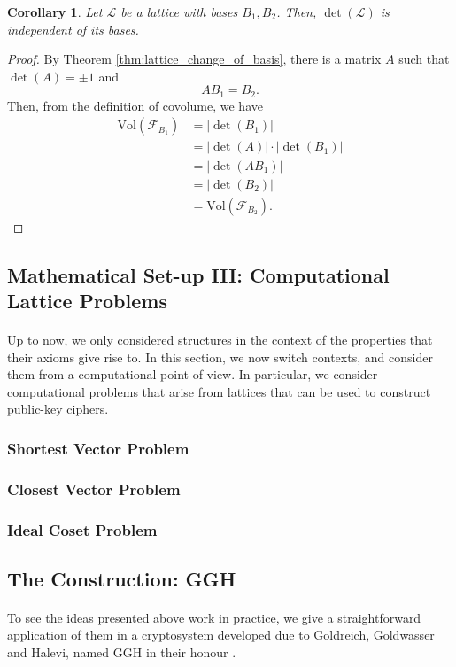 \documentclass{article}
\newtheorem{corollary}{Corollary}[theorem]
\theoremstyle{definition}
\newcommand{\Vol}{\text{Vol}}
\renewcommand{\L}{\mathcal{L}}
\newcommand{\F}{\mathcal{F}}
\begin{document}
\begin{corollary}
  Let $\L$ be a lattice with bases $B_1, B_2$. Then, $\det(\L)$ is independent
  of its bases.
\end{corollary}
\begin{proof}
  By Theorem \ref{thm:lattice_change_of_basis}, there is a matrix $A$ such that
  $\det(A) = \pm 1$ and
  \[
    AB_1 = B_2.
  \]
  Then, from the definition of covolume, we have
  \begin{align*}
    \Vol(\F_{B_1}) &= |\det(B_1)| \\
                  &= |\det(A)| \cdot |\det(B_1)| \\
                  &= |\det(AB_1) | \\
                  &= |\det(B_2)| \\
                  &= \Vol(\F_{B_2}).
  \end{align*}
\end{proof}
\subsection{Mathematical Set-up III: Computational Lattice Problems}
\paragraph{} Up to now, we only considered structures in the context of the
properties that their axioms give rise to. In this section, we now switch
contexts, and consider them from a computational point of view. In particular,
we consider computational problems that arise from lattices that can be used to
construct public-key ciphers.
\subsubsection{Shortest Vector Problem}
\subsubsection{Closest Vector Problem}
\subsubsection{Ideal Coset Problem}
\cite{Babai1986}
\cite{AjtaiLatticeAvgWorst}
\subsection{The Construction: GGH}
\paragraph{} To see the ideas presented above work in practice, we give a
straightforward application of them in a cryptosystem developed due to
Goldreich, Goldwasser and Halevi, named GGH in their honour \cite{goldreich1997public}.
\end{document}
